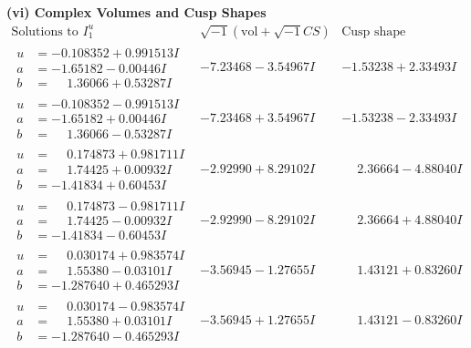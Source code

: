 \documentclass[1p]{elsarticle_modified}
\theoremstyle{definition}
\newcommand{\I}{\sqrt{-1}}
\begin{document}
\newpage\flushleft \textbf{(vi) Complex Volumes and Cusp Shapes}
$$\begin{array}{c|c|c}  
\text{Solutions to }I^u_{1}& \I (\text{vol} + \sqrt{-1}CS) & \text{Cusp shape}\\
 \hline 
\begin{aligned}
u &= -0.108352 + 0.991513 I \\
a &= -1.65182 - 0.00446 I \\
b &= \phantom{-}1.36066 + 0.53287 I\end{aligned}
 & -7.23468 - 3.54967 I & -1.53238 + 2.33493 I \\ \hline\begin{aligned}
u &= -0.108352 - 0.991513 I \\
a &= -1.65182 + 0.00446 I \\
b &= \phantom{-}1.36066 - 0.53287 I\end{aligned}
 & -7.23468 + 3.54967 I & -1.53238 - 2.33493 I \\ \hline\begin{aligned}
u &= \phantom{-}0.174873 + 0.981711 I \\
a &= \phantom{-}1.74425 + 0.00932 I \\
b &= -1.41834 + 0.60453 I\end{aligned}
 & -2.92990 + 8.29102 I & \phantom{-}2.36664 - 4.88040 I \\ \hline\begin{aligned}
u &= \phantom{-}0.174873 - 0.981711 I \\
a &= \phantom{-}1.74425 - 0.00932 I \\
b &= -1.41834 - 0.60453 I\end{aligned}
 & -2.92990 - 8.29102 I & \phantom{-}2.36664 + 4.88040 I \\ \hline\begin{aligned}
u &= \phantom{-}0.030174 + 0.983574 I \\
a &= \phantom{-}1.55380 - 0.03101 I \\
b &= -1.287640 + 0.465293 I\end{aligned}
 & -3.56945 - 1.27655 I & \phantom{-}1.43121 + 0.83260 I \\ \hline\begin{aligned}
u &= \phantom{-}0.030174 - 0.983574 I \\
a &= \phantom{-}1.55380 + 0.03101 I \\
b &= -1.287640 - 0.465293 I\end{aligned}
 & -3.56945 + 1.27655 I & \phantom{-}1.43121 - 0.83260 I \\ \hline\begin{aligned}

\end{aligned}
\end{array}$$
\end{document}
